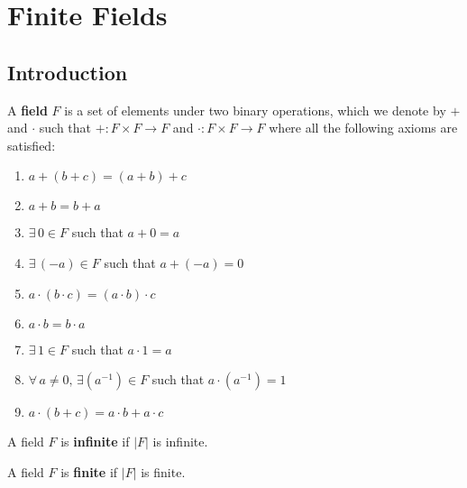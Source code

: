\chapter{Finite Fields}

\section{Introduction}
\begin{defbox}
    \begin{definition}
        A \textbf{field} $ F $ is a set of elements under two binary operations,
        which we denote by $ + $ and $ \cdot $ such that
        $ +:F\times F\rightarrow F $ and $ \cdot:F\times F\rightarrow F $
        where all the following axioms are satisfied:
        \begin{enumerate}[label=V\arabic*]
            \item $ a+(b+c)=(a+b)+c $
            \item $ a+b=b+a $
            \item $ \exists\, 0\in F $ such that $ a+0=a $
            \item $ \exists\, (-a)\in F $ such that $ a+(-a)=0 $
            \item $ a\cdot (b\cdot c)=(a\cdot b)\cdot c $
            \item $ a\cdot b=b\cdot a $
            \item $ \exists\, 1\in F $ such that $ a\cdot 1=a $
            \item $ \forall\,a\neq 0,\,\exists (a^{-1})\in F $ such that
                  $ a\cdot (a^{-1})=1 $
            \item $ a\cdot (b+c)=a\cdot b+a\cdot c $
        \end{enumerate}
    \end{definition}
\end{defbox}

\begin{defbox}
    \begin{definition}
        A field $ F $ is \textbf{infinite} if $ |F| $ is infinite.
    \end{definition}
\end{defbox}

\begin{defbox}
    \begin{definition}
        A field $ F $ is \textbf{finite} if $ |F| $ is finite.
    \end{definition}
\end{defbox}

